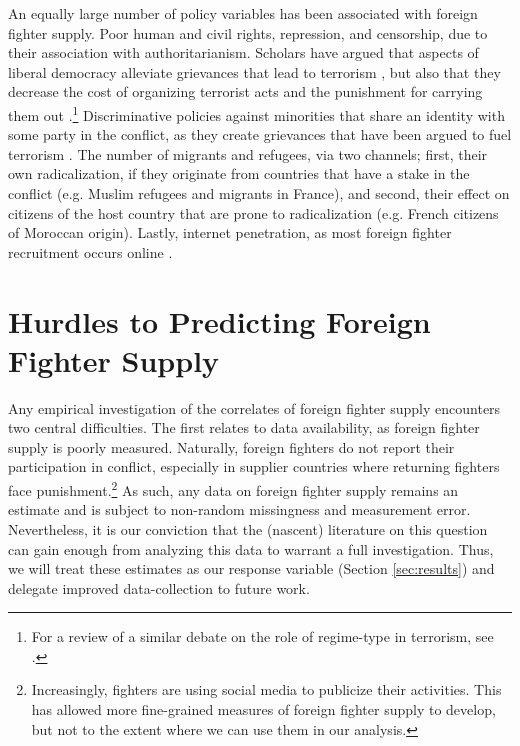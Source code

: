 \documentclass[12pt]{article}
\begin{document}
An equally large number of policy variables has been associated with foreign fighter supply. Poor human and civil rights, repression, and censorship, due to their association with authoritarianism. Scholars have argued that aspects of liberal democracy alleviate grievances that lead to terrorism \citep{Crenshaw1981}, but also that they decrease the cost of organizing terrorist acts and the punishment for carrying them out \citep{Schmid1992}.\footnote{For a review of a similar debate on the role of regime-type in terrorism, see \cite{Chenoweth2013}.} Discriminative policies against minorities that share an identity with some party in the conflict, as they create grievances that have been argued to fuel terrorism \citep{Piazza2011, Sageman2008}. The number of migrants and refugees, via two channels; first, their own radicalization, if they originate from countries that have a stake in the conflict (e.g. Muslim refugees and migrants in France), and second, their effect on citizens of the host country that are prone to radicalization (e.g. French citizens of Moroccan origin). Lastly, internet penetration, as most foreign fighter recruitment occurs online \citep{Hegghammer2011}.	

\section{Hurdles to Predicting Foreign Fighter Supply}	\label{sec:hurdles}

Any empirical investigation of the correlates of foreign fighter supply encounters two central difficulties. The first relates to data availability, as foreign fighter supply is poorly measured. Naturally, foreign fighters do not report their participation in conflict, especially in supplier countries where returning fighters face punishment.\footnote{Increasingly, fighters are using social media to publicize their activities. This has allowed more fine-grained measures of foreign fighter supply to develop, but not to the extent where we can use them in our analysis.} As such, any data on foreign fighter supply remains an estimate and is subject to non-random missingness and measurement error. Nevertheless, it is our conviction that the (nascent) literature on this question can gain enough from analyzing this data to warrant a full investigation. Thus, we will treat these estimates as our response variable (Section \ref{sec:results}) and delegate improved data-collection to future work. \\
\end{document}

